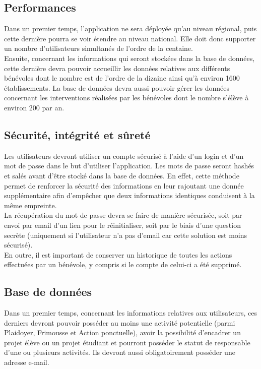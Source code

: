 \subsection{Performances}

Dans un premier temps, l'application ne sera déployée qu'au niveau régional, puis cette dernière pourra se voir étendre au niveau national. Elle doit donc supporter un nombre d'utilisateurs simultanés de l'ordre de la centaine. \\

Ensuite, concernant les informations qui seront stockées dans la base de données, cette dernière devra pouvoir accueillir les données relatives aux différents bénévoles dont le nombre est de l'ordre de la dizaine ainsi qu'à environ 1600 établissements. La base de données devra aussi pouvoir gérer les données concernant les interventions réalisées par les bénévoles dont le nombre s'élève à environ 200 par an.

\subsection{Sécurité, intégrité et sûreté}

Les utilisateurs devront utiliser un compte sécurisé à l'aide d'un login et d'un mot de passe dans le but d'utiliser l'application. Les mots de passe seront hashés et salés avant d'être stocké dans la base de données. En effet, cette méthode permet de renforcer la sécurité des informations en leur rajoutant une donnée supplémentaire afin d'empêcher que deux informations identiques conduisent à la même empreinte. \\

 La récupération du mot de passe devra se faire de manière sécurisée, soit par envoi par email d'un lien pour le réinitialiser, soit par le biais d'une question secrète (uniquement si l'utilisateur n'a pas d'email car cette solution est moins sécurisé).\\

En outre, il est important de conserver un historique de toutes les actions effectuées par un bénévole, y compris si le compte de celui-ci a été supprimé. 

\subsection{Base de données}

Dans un premier temps, concernant les informations relatives aux utilisateurs, ces derniers devront pouvoir posséder au moins une activité potentielle (parmi Plaidoyer, Frimousse et Action ponctuelle), avoir la possibilité d'encadrer un projet élève ou un projet étudiant et pourront posséder le statut de responsable d'une ou plusieurs activités. Ils devront aussi obligatoirement posséder une adresse e-mail. \\

